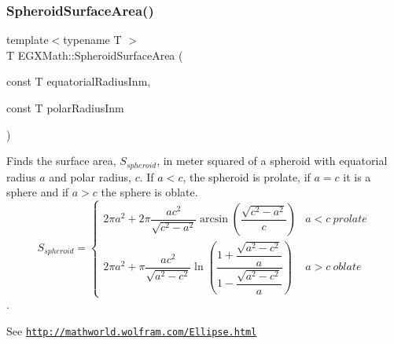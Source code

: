 \subsubsection{\texorpdfstring{Spheroid\+Surface\+Area()}{SpheroidSurfaceArea()}}
{\footnotesize\ttfamily template$<$typename T $>$ \\
T E\+G\+X\+Math\+::\+Spheroid\+Surface\+Area (\begin{DoxyParamCaption}\item[{const T}]{equatorial\+Radius\+Inm,  }\item[{const T}]{polar\+Radius\+Inm }\end{DoxyParamCaption})}



Finds the surface area, $S_{spheroid}$, in meter squared of a spheroid with equatorial radius $a$ and polar radius, $c$. If $a < c$, the spheroid is prolate, if $a = c$ it is a sphere and if $a>c$ the sphere is oblate. \[ S_{spheroid}=\begin{cases} 2\pi a^2 + 2\pi\dfrac{a c^2}{\sqrt{c^2-a^2}}\arcsin \left ( \dfrac{\sqrt{c^2-a^2}}{c} \right ) & a<c\ prolate \\ 2\pi a^2 +\pi \dfrac{a c^2}{\sqrt{a^2-c^2}}\ln \left(\dfrac{1+\dfrac{\sqrt{a^2-c^2}}{a}}{1-\dfrac{\sqrt{a^2-c^2}}{a}}\right )& a>c\ oblate \end{cases} \]. 

See \href{http://mathworld.wolfram.com/Ellipse.html}{\tt http\+://mathworld.\+wolfram.\+com/\+Ellipse.\+html}


